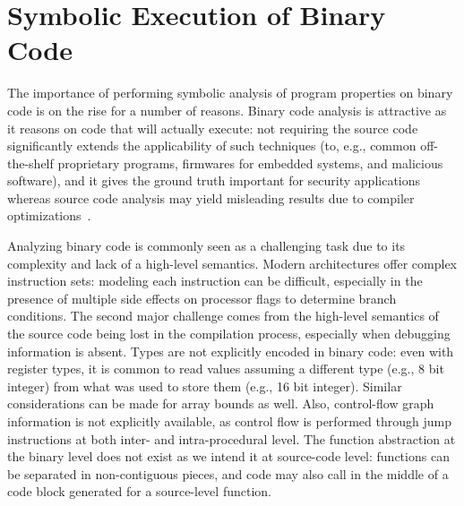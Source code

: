 
\iffalse
  \item {\em Binary code}: what issues can arise when symbolically executing binary code?
 While the warm-up example of Section~\ref{symbolic-execution-example} is written in C, in several scenarios binary code is the only available representation of a program. However, having the source code of an application can make symbolic execution significantly easier, as it can exploit high-level properties (e.g., object shapes) that can be inferred statically by analyzing the source code.
\fi

\section{Symbolic Execution of Binary Code}
\label{se:symbolic-binary}

The importance of performing symbolic analysis of program properties on binary code is on the rise for a number of reasons. Binary code analysis is attractive as it reasons on code that will actually execute: not requiring the source code significantly extends the applicability of such techniques (to, e.g., common off-the-shelf proprietary programs, firmwares for embedded systems, and malicious software), and it gives the ground truth important for security applications whereas source code analysis may yield misleading results due to compiler optimizations~\cite{BITBLAZE-ICISS08}. %


Analyzing binary code is commonly seen as a challenging task due to its complexity and lack of a high-level semantics. Modern architectures offer complex instruction sets: modeling each instruction can be difficult, especially in the presence of multiple side effects on processor flags to determine branch conditions. The second major challenge comes from the high-level semantics of the source code being lost in the compilation process, especially when debugging information is absent. Types are not explicitly encoded in binary code: even with register types, it is common to read values assuming a different type (e.g., 8 bit integer) from what was used to store them (e.g., 16 bit integer). Similar considerations can be made for array bounds as well. Also, control-flow graph information is not explicitly available, as control flow is performed through jump instructions at both inter- and intra-procedural level. The function abstraction at the binary level does not exist as we intend it at source-code level: functions can be separated in non-contiguous pieces, and code may also call in the middle of a code block generated for a source-level function.

